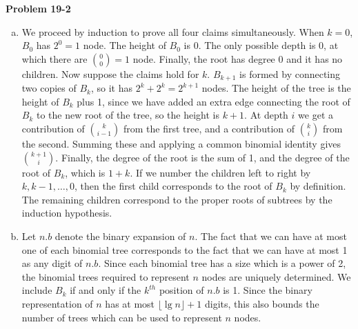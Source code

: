 \documentclass{article}
\begin{document}
\noindent\textbf{Problem 19-2}\\
\begin{enumerate}[a.]
\item We proceed by induction to prove all four claims simultaneously.  When $k=0$, $B_0$ has $2^0 = 1$ node. The height of $B_0$ is 0. The only possible depth is 0, at which there are ${0 \choose 0} = 1$ node.  Finally, the root has degree 0 and it has no children.  Now suppose the claims hold for $k$.  $B_{k+1}$ is formed by connecting two copies of $B_k$, so it has $2^k + 2^k = 2^{k+1}$ nodes. The height of the tree is the height of $B_k$ plus 1, since we have added an extra edge connecting the root of $B_k$ to the new root of the tree, so the height is $k+1$.  At depth $i$ we get a contribution of ${k \choose i-1}$ from the first tree, and a contribution of ${k \choose i}$ from the second.  Summing these and applying a common binomial identity gives ${k+1 \choose i}$. Finally, the degree of the root is the sum of 1, and the degree of the root of $B_k$, which is $1+ k$. If we number the children left to right by $k, k-1, \ldots, 0$, then the first child corresponds to the root of $B_k$ by definition. The remaining children correspond to the proper roots of subtrees by the induction hypothesis. \\

\item Let $n.b$ denote the binary expansion of $n$.  The fact that we can have at most one of each binomial tree corresponds to the fact that we can have at most 1 as any digit of $n.b$.  Since each binomial tree has a size which is a power of 2, the binomial trees required to represent $n$ nodes are uniquely determined.  We include $B_k$ if and only if the $k^{th}$ position of $n.b$ is 1.  Since the binary representation of $n$ has at most $\lfloor \lg n \rfloor + 1$ digits, this also bounds the number of trees which can be used to represent $n$ nodes. \\


\end{enumerate}
\end{document}
